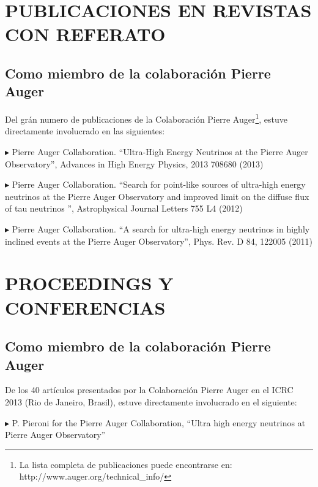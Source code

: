 \documentclass[letterpaper]{article}
\renewenvironment{itemize}{
  \begin{list}{}{
    \setlength{\leftmargin}{1.5em}
  }
}{
  \end{list}
}
\begin{document}
 
\section*{PUBLICACIONES EN REVISTAS CON REFERATO} 
\subsection*{Como miembro de la colaboración Pierre Auger}
Del grán numero de publicaciones de la Colaboración Pierre Auger\footnote{La lista completa de publicaciones puede encontrarse en: http://www.auger.org/technical\_info/}, estuve directamente involucrado en las siguientes:
\begin{itemize} %

 \item{$\blacktriangleright$} Pierre Auger Collaboration. ``Ultra-High Energy Neutrinos at the Pierre Auger Observatory'', Advances in High Energy Physics, 2013 708680 (2013)
 
 \item{$\blacktriangleright$} Pierre Auger Collaboration. ``Search for point-like sources of ultra-high energy neutrinos at the Pierre Auger Observatory and improved limit on the diffuse flux of tau neutrinos '', Astrophysical Journal Letters 755 L4 (2012)
 
 \item{$\blacktriangleright$} Pierre Auger Collaboration. ``A search for ultra-high energy neutrinos in highly inclined events at the Pierre Auger Observatory'', Phys. Rev. D 84, 122005 (2011)
 
\end{itemize}

 
\section*{PROCEEDINGS Y CONFERENCIAS} 
\subsection*{Como miembro de la colaboración Pierre Auger}

De los 40 artículos presentados por la Colaboración Pierre Auger en el ICRC 2013 (Rio de Janeiro, Brasil), estuve directamente involucrado en el siguiente:
 \begin{itemize}%
  \item{$\blacktriangleright$} P. Pieroni for the Pierre Auger Collaboration, ``Ultra high energy neutrinos at Pierre Auger Observatory''
 \end{itemize}
\end{document}
